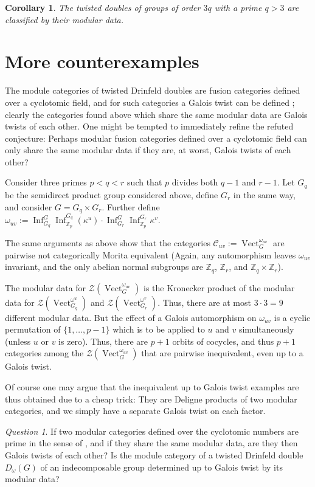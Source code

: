 \documentclass[12pt]{amsart}
\newtheorem{Cor}[Thm]{Corollary}
\theoremstyle{remark}
\newtheorem{Qu}[Thm]{Question}
\theoremstyle{definition}
\numberwithin{equation}{section}
\newcommand\Vect{\operatorname{Vect}}
\newcommand\ZZ{\mathbb Z}
\newcommand\C{\mathcal C}
\newcommand\CTR{\mathcal Z}
\newcommand\Inf{\operatorname{Inf}}
\begin{document}
\begin{Cor}
The twisted doubles of groups of order $3q$ with a prime $q>3$ are classified by their modular data.
\end{Cor}

\section{More counterexamples}
\label{sec:worse}


The module categories of twisted Drinfeld doubles are fusion categories defined over a cyclotomic field, and for such categories a Galois twist can be defined \cite{2013arXiv1305.2229D}; clearly the categories found above which share the same modular data are Galois twists of each other. One might be tempted to immediately refine the refuted conjecture: Perhaps modular fusion categories defined over a cyclotomic field can only share the same modular data if they are, at worst, Galois twists of each other?

Consider three primes $p<q<r$ such that $p$ divides both $q-1$ and $r-1$. Let $G_q$ be the semidirect product group considered above, define $G_r$ in the same way, and consider $G=G_q\times G_r$. Further define $\omega_{uv}:=\Inf_{G_q}^G\Inf_{\ZZ_p}^{G_q}(\kappa^u)\cdot\Inf_{G_r}^G\Inf_{\ZZ_p}^{G_r}\kappa^v$.

The same arguments as above show that the categories $\C_{uv}:=\Vect_G^{\omega_{uv}}$ are pairwise not categorically Morita equivalent (Again, any automorphism leaves $\omega_{uv}$ invariant, and the only abelian normal subgroups are $\ZZ_q$, $\ZZ_r$, and $\ZZ_q\times\ZZ_r$).

The modular data for $\CTR(\Vect_G^{\omega_{uv}})$ is the Kronecker product of the modular data for $\CTR(\Vect_{G_q}^{\omega^u})$ and $\CTR(\Vect_{G_r}^{\omega^v})$. Thus, there are at most $3\cdot 3=9$ different modular data. But the effect of a Galois automorphism on $\omega_{uv}$ is a cyclic permutation of $\{1,\dots,p-1\}$ which is to be applied to $u$ and $v$ simultaneously (unless $u$ or $v$ is zero). Thus, there are $p+1$ orbits of cocycles, and thus $p+1$ categories among the $\CTR(\Vect_G^{\omega_{uv}})$ that are pairwise inequivalent, even up to a Galois twist.

Of course one may argue that the inequivalent up to Galois twist examples are thus obtained due to a cheap trick: They are Deligne products of two modular categories, and we simply have a separate Galois twist on each factor.
\begin{Qu}
  If two modular categories defined over the cyclotomic numbers are prime in the sense of \cite{MR1990929}, and if they share the same modular data, are they then Galois twists of each other? Is the module category of a twisted Drinfeld double $D_\omega(G)$ of an indecomposable group determined up to Galois twist by its modular data?
\end{Qu}




\end{document}

